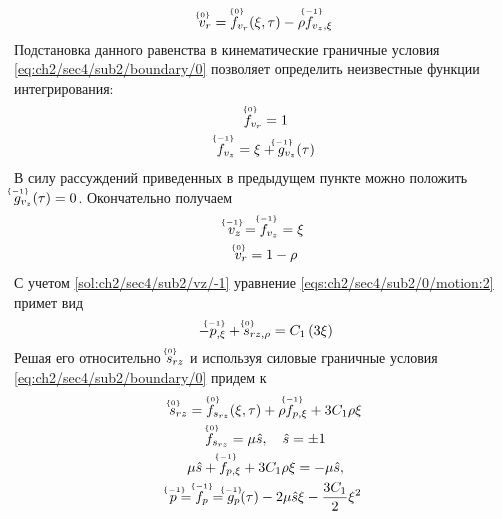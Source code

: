 \begin{equation*}
  \uindex{v}{0}_{r} = \uindex{f}{0}_{v_{r}}(\xi, \tau) -\rho \uindex{f}{-1}_{v_{z},\xi}
\end{equation*}
Подстановка данного равенства в кинематические граничные условия \cref{eq:ch2/sec4/sub2/boundary/0} позволяет определить неизвестные функции интегрирования:
\begin{gather*}
  \uindex{f}{0}_{v_{r}} = 1
  \\
  \uindex{f}{-1}_{v_{z}} = \xi + \uindex{g}{-1}_{v_{z}}(\tau)
\end{gather*}
В силу рассуждений приведенных в предыдущем пункте можно положить $\uindex{g}{-1}_{v_{z}}(\tau) = 0$. Окончательно получаем
\begin{gather}
  \label{sol:ch2/sec4/sub2/vz/-1}
  \uindex{v}{-1}_{z} = \uindex{f}{-1}_{v_{z}} = \xi
  \\
  \label{sol:ch2/sec4/sub2/vr/0}
  \uindex{v}{0}_{r} =  1 - \rho
\end{gather}
С учетом \cref{sol:ch2/sec4/sub2/vz/-1} уравнение \cref{eqs:ch2/sec4/sub2/0/motion:2} примет вид
\begin{equation*}
  -\uindex{p}{-1}_{,\xi} + \uindex{s}{0}_{rz,\rho} = C_1 \left(3 \xi \right)
\end{equation*}
Решая его относительно $\uindex{s}{0}_{rz}$ и используя силовые граничные условия \cref{eq:ch2/sec4/sub2/boundary/0} придем к
\begin{gather*}
  \uindex{s}{0}_{rz} = \uindex{f}{0}_{s_{rz}}(\xi, \tau) + \rho \uindex{f}{-1}_{p,\xi} + 3 C_1 \rho \xi
  \\
  \uindex{f}{0}_{s_{rz}} = \mu\hat{s}, \quad \hat{s} = \pm 1
  \\
  \mu\hat{s} +\uindex{f}{-1}_{p,\xi} + 3 C_1 \rho \xi = -\mu \hat{s},
  \\
  \uindex{p}{-1}=\uindex{f}{-1}_{p} =\uindex{g}{-1}_{p}(\tau) -2\mu\hat{s}\xi - \frac{3 C_1}{2}\xi^2
\end{gather*}

